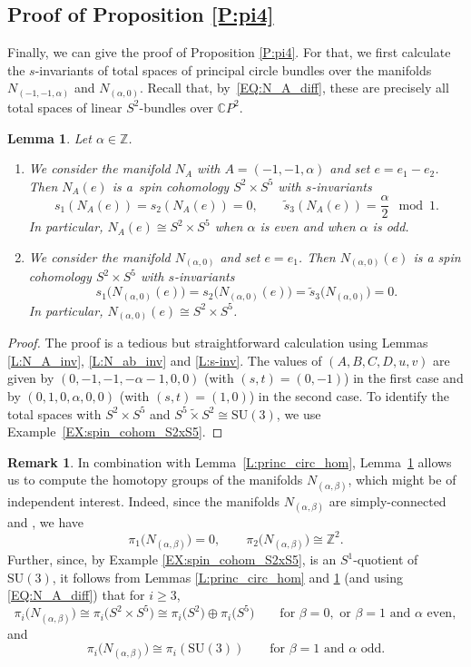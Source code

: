 \documentclass[10pt,a4paper]{amsart}
\numberwithin{equation}{section}
\newtheorem{Lemma}[Theorem]{Lemma}
\theoremstyle{definition}
\newtheorem{Remark}[Theorem]{Remark}
\numberwithin{table}{section}
\newcommand{\Z}{\mathbb{Z}}
\newcommand{\C}{\mathbb{C}}
\newcommand{\ttimes}{\mathrel{\widetilde{\times} }}
\begin{document}
\subsection{Proof of Proposition \ref{P:pi4}}\label{SS:pi4}

Finally, we can give the proof of Proposition \ref{P:pi4}. For that, we first calculate the $s$-invariants of total spaces of principal circle bundles over the manifolds $N_{(-1,-1,\alpha)}$ and $N_{(\alpha,0)}$. Recall that, by~\eqref{EQ:N_A_diff}, these are precisely all total spaces of linear $S^2$-bundles over $\C P^2$.
\begin{Lemma}\label{L:s_inv_S2-bdls}
	Let $\alpha\in\Z$.
	\begin{enumerate}\itemsep=0pt
		\item[$(1)$] We consider the manifold $N_{A}$ with $A=(-1,-1,\alpha)$ and set $e=e_1-e_2$. Then $N_{A}(e)$ is a~spin cohomology $S^2\times S^5$ with $s$-invariants
		\[ s_1(N_A(e))=s_2(N_A(e))=0,\qquad \tilde{s}_3(N_A(e))=\frac{\alpha}{2}\mod 1. \]
		In particular, $N_A(e)\cong S^2\times S^5$ when $\alpha$ is even and \smash{$N_A(e)\cong S^5\ttimes S^2$} when $\alpha$ is odd.
		\item[$(2)$] We consider the manifold $N_{(\alpha,0)}$ and set $e=e_1$. Then $N_{(\alpha,0)}(e)$ is a spin cohomology $S^2\times S^5$ with $s$-invariants
		\[ s_1\bigl(N_{(\alpha,0)}(e)\bigr)=s_2\bigl(N_{(\alpha,0)}(e)\bigr)=\tilde{s}_3\bigl(N_{(\alpha,0)}\bigr)=0. \]
		In particular, $N_{(\alpha,0)}(e)\cong S^2\times S^5$.
	\end{enumerate}
\end{Lemma}
\begin{proof}
	The proof is a tedious but straightforward calculation using Lemmas \ref{L:N_A_inv}, \ref{L:N_ab_inv} and \ref{L:s-inv}. The values of $(A,B,C,D,u,v)$ are given by $(0,-1,-1,-\alpha-1,0,0)$ (with $(s,t)=(0,-1)$) in the first case and by $(0,1,0,\alpha,0,0)$ (with $(s,t)=(1,0)$) in the second case. To identify the total spaces with $S^2\times S^5$ and $S^5\ttimes S^2\cong\mathrm{SU}(3)$, we use Example~\ref{EX:spin_cohom_S2xS5}.
\end{proof}

\begin{Remark}
	In combination with Lemma~\ref{L:princ_circ_hom}, Lemma~\ref{L:s_inv_S2-bdls} allows us to compute the homotopy groups of the manifolds $N_{(\alpha,\beta)}$, which might be of independent interest. Indeed, since the manifolds $N_{(\alpha,\beta)}$ are simply-connected and \smash{$H_2\bigl(N_{(\alpha,\beta)}\bigr)\cong\Z^2$}, we have
	\[ \pi_1\bigl(N_{(\alpha,\beta)}\bigr)=0,\qquad\pi_2\bigl(N_{(\alpha,\beta)}\bigr)\cong\Z^2. \]
	Further, since, by Example \ref{EX:spin_cohom_S2xS5}, \smash{$S^5\ttimes S^2$} is an $S^1$-quotient of $\mathrm{SU}(3)$, it follows from Lemmas \ref{L:princ_circ_hom} and \ref{L:s_inv_S2-bdls} (and using \eqref{EQ:N_A_diff}) that for $i\geq3$,
	\[ \pi_i\bigl(N_{(\alpha,\beta)}\bigr)\cong \pi_i\bigl(S^2\times S^5\bigr)\cong\pi_i\bigl(S^2\bigr)\oplus\pi_i\bigl(S^5\bigr)\qquad \text{for }\beta=0,\text{ or }\beta=1\text{ and }\alpha\text{ even}, \]
	and
	\[ \pi_i\bigl(N_{(\alpha,\beta)}\bigr)\cong \pi_i(\mathrm{SU}(3))\qquad \text{for }\beta=1\text{ and }\alpha\text{ odd}. \]
\end{Remark}
\end{document}
